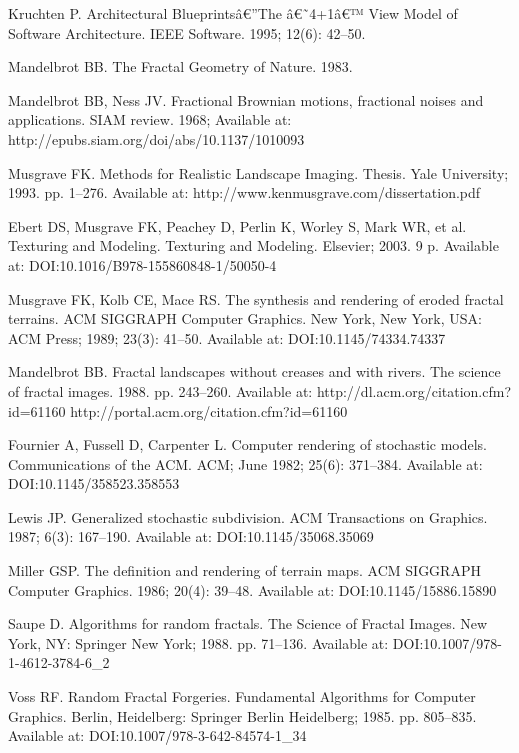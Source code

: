 Kruchten P. {Architectural Blueprintsâ€”The â€˜4+1â€™ View Model of Software Architecture}. IEEE Software. 1995; 12(6): 42--50.

Mandelbrot BB. The Fractal Geometry of Nature. 1983.

Mandelbrot BB, Ness JV. Fractional Brownian motions, fractional noises and applications. SIAM review. 1968; Available at: http://epubs.siam.org/doi/abs/10.1137/1010093

Musgrave FK. Methods for Realistic Landscape Imaging. Thesis. Yale University; 1993. pp. 1--276. Available at: http://www.kenmusgrave.com/dissertation.pdf

Ebert DS, Musgrave FK, Peachey D, Perlin K, Worley S, Mark WR, et al. Texturing and Modeling. Texturing and Modeling. Elsevier; 2003. 9 p. Available at: DOI:10.1016/B978-155860848-1/50050-4

Musgrave FK, Kolb CE, Mace RS. The synthesis and rendering of eroded fractal terrains. ACM SIGGRAPH Computer Graphics. New York, New York, USA: ACM Press; 1989; 23(3): 41--50. Available at: DOI:10.1145/74334.74337

Mandelbrot BB. Fractal landscapes without creases and with rivers. The science of fractal images. 1988. pp. 243--260. Available at: http://dl.acm.org/citation.cfm?id=61160 http://portal.acm.org/citation.cfm?id=61160

Fournier A, Fussell D, Carpenter L. Computer rendering of stochastic models. Communications of the ACM. ACM; June 1982; 25(6): 371--384. Available at: DOI:10.1145/358523.358553

Lewis JP. Generalized stochastic subdivision. ACM Transactions on Graphics. 1987; 6(3): 167--190. Available at: DOI:10.1145/35068.35069

Miller GSP. The definition and rendering of terrain maps. ACM SIGGRAPH Computer Graphics. 1986; 20(4): 39--48. Available at: DOI:10.1145/15886.15890

Saupe D. Algorithms for random fractals. The Science of Fractal Images. New York, NY: Springer New York; 1988. pp. 71--136. Available at: DOI:10.1007/978-1-4612-3784-6\_2

Voss RF. Random Fractal Forgeries. Fundamental Algorithms for Computer Graphics. Berlin, Heidelberg: Springer Berlin Heidelberg; 1985. pp. 805--835. Available at: DOI:10.1007/978-3-642-84574-1\_34

